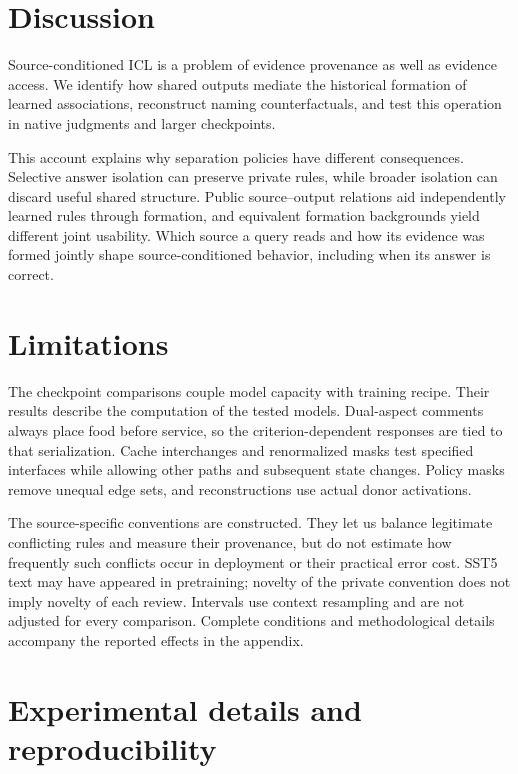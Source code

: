 \documentclass[11pt]{article}
\begin{document}
\section{Discussion}\label{discussion}

Source-conditioned ICL is a problem of evidence provenance as well as evidence access. We identify how shared outputs mediate the historical formation of learned associations, reconstruct naming counterfactuals, and test this operation in native judgments and larger checkpoints.

This account explains why separation policies have different consequences. Selective answer isolation can preserve private rules, while broader isolation can discard useful shared structure. Public source--output relations aid independently learned rules through formation, and equivalent formation backgrounds yield different joint usability. Which source a query reads and how its evidence was formed jointly shape source-conditioned behavior, including when its answer is correct.

\clearpage
\section*{Limitations}
\label{sec:limitations}

The checkpoint comparisons couple model capacity with training recipe. Their results describe the computation of the tested models. Dual-aspect comments always place food before service, so the criterion-dependent responses are tied to that serialization. Cache interchanges and renormalized masks test specified interfaces while allowing other paths and subsequent state changes. Policy masks remove unequal edge sets, and reconstructions use actual donor activations.

The source-specific conventions are constructed. They let us balance legitimate conflicting rules and measure their provenance, but do not estimate how frequently such conflicts occur in deployment or their practical error cost. SST5 text may have appeared in pretraining; novelty of the private convention does not imply novelty of each review. Intervals use context resampling and are not adjusted for every comparison. Complete conditions and methodological details accompany the reported effects in the appendix.


\clearpage
\appendix
\section{Experimental details and reproducibility}\label{experimental-details-and-reproducibility}
\end{document}
